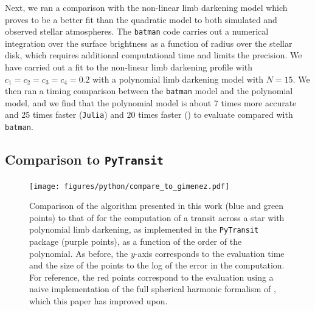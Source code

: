 \documentclass[modern]{aastex61}
\begin{document}
Next, we ran a comparison with the non-linear limb darkening model which
proves to be a better fit than the quadratic model to both simulated
and observed stellar atmospheres.  The \texttt{batman} code carries out
a numerical integration over the surface brightness as a function of
radius over the stellar disk, which requires additional computational
time and limits the precision.  We have carried out a fit to the
non-linear limb darkening profile with $c_1=c_2=c_3=c_4=0.2$ with a
polynomial limb darkening model with $N=15$.  We then ran a timing
comparison between the \texttt{batman} model and the polynomial
model, and we find that the polynomial model is about 7 times
more accurate and 25 times faster (\texttt{Julia})
and 20 times faster (\starry) to evaluate compared with \texttt{batman}.

\subsection{Comparison to \texttt{PyTransit}}

\begin{figure}[t!]
    \begin{centering}
    \texttt{[image: figures/python/compare\_to\_gimenez.pdf]}
    \caption{Comparison of the algorithm presented in this work (blue and
             green points) to that of
             \citet{Gimenez2006} for the computation of a transit across a
             star with polynomial limb darkening, as implemented in the
             \texttt{PyTransit} package \citep{Parviainen2015b}
             (purple points), as a function
             of the order of the polynomial. As before, the $y$-axis
             corresponds to the evaluation time and the size of the points
             to the log of the error in the computation. For reference, the
             red points correspond to the evaluation using a naive implementation
             of the full spherical harmonic formalism of \citet{starry}, which
             this paper has improved upon.
    \label{fig:gimenez_comparison}}
    \end{centering}
\end{figure}
\end{document}

